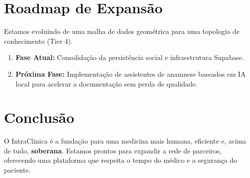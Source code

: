 \documentclass[12pt,a4paper]{article}
\begin{document}
\section{Roadmap de Expansão}
Estamos evoluindo de uma malha de dados geométrica para uma topologia de conhecimento (Tier 4). 
\begin{enumerate}
    \item \textbf{Fase Atual:} Consolidação da persistência social e infraestrutura Supabase.
    \item \textbf{Próxima Fase:} Implementação de assistentes de anamnese baseados em IA local para acelerar a documentação sem perda de qualidade.
\end{enumerate}

\section{Conclusão}
O IntraClinica é a fundação para uma medicina mais humana, eficiente e, acima de tudo, \textbf{soberana}. Estamos prontos para expandir a rede de parceiros, oferecendo uma plataforma que respeita o tempo do médico e a segurança do paciente.
\end{document}
